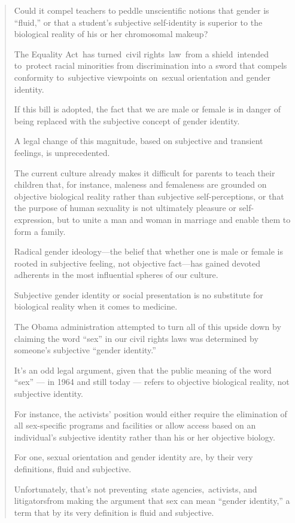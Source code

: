 \documentclass[11pt]{article}
\begin{document}
\begin{quote}
Could it compel teachers to peddle unscientific notions that gender is “fluid,” or that a student’s subjective self-identity is superior to the biological reality of his or her chromosomal makeup?

The Equality Act has turned civil rights law from a shield intended to protect racial minorities from discrimination into a sword that compels conformity to subjective viewpoints on sexual orientation and gender identity.

If this bill is adopted, the fact that we are male or female is in danger of being replaced with the subjective concept of gender identity.

A legal change of this magnitude, based on subjective and transient feelings, is unprecedented.

The current culture already makes it difficult for parents to teach their children that, for instance, maleness and femaleness are grounded on objective biological reality rather than subjective self-perceptions, or that the purpose of human sexuality is not ultimately pleasure or self-expression, but to unite a man and woman in marriage and enable them to form a family.

Radical gender ideology—the belief that whether one is male or female is rooted in subjective feeling, not objective fact—has gained devoted adherents in the most influential spheres of our culture.

Subjective gender identity or social presentation is no substitute for biological reality when it comes to medicine.

The Obama administration ­attempted to turn all of this upside down by claiming the word “sex” in our civil rights laws was determined by someone’s subjective “gender identity.”

It’s an odd legal argument, given that the public meaning of the word “sex” — in 1964 and still today — refers to objective biological reality, not subjective identity.

For instance, the activists’ position would either require the elimination of all sex-specific programs and facilities or allow access based on an individual’s subjective identity rather than his or her objective biology.

For one, sexual orientation and gender identity are, by their very definitions, fluid and subjective.

Unfortunately, that’s not preventing state agencies, activists, and litigatorsfrom making the argument that sex can mean “gender identity,” a term that by its very definition is fluid and subjective.


\end{quote}
\end{document}
